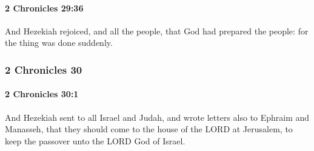 		\paragraph{2 Chronicles 29:36} %
			\label{2CHRONICLES-29-36}

			And Hezekiah rejoiced, and all the people, that God had prepared the people: for the thing was done suddenly.

	\subsubsection{2 Chronicles 30} %
		\label{2CHRONICLES-30}

		\paragraph{2 Chronicles 30:1} %
			\label{2CHRONICLES-30-1}

			And Hezekiah sent to all Israel and Judah, and wrote letters also to Ephraim and Manasseh, that they should come to the house of the LORD at Jerusalem, to keep the passover unto the LORD God of Israel.


